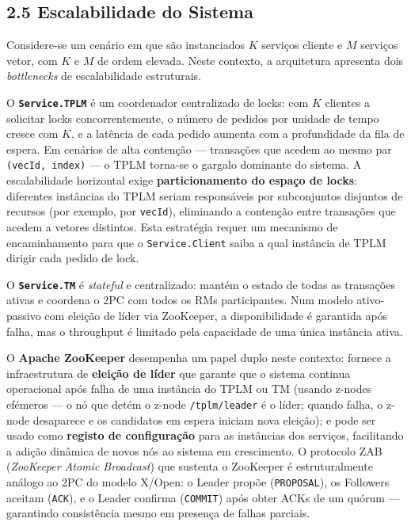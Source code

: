 \subsection*{2.5 Escalabilidade do Sistema}

Considere-se um cenário em que são instanciados $K$ serviços cliente e $M$ serviços vetor, com
$K$ e $M$ de ordem elevada. Neste contexto, a arquitetura apresenta dois \textit{bottlenecks}
de escalabilidade estruturais.

O \textbf{\texttt{Service.TPLM}} é um coordenador centralizado de locks: com $K$ clientes a
solicitar locks concorrentemente, o número de pedidos por unidade de tempo cresce com $K$, e a
latência de cada pedido aumenta com a profundidade da fila de espera. Em cenários de alta
contenção --- transações que acedem ao mesmo par \texttt{(vecId, index)} --- o TPLM torna-se o
gargalo dominante do sistema. A escalabilidade horizontal exige \textbf{particionamento do espaço
de locks}: diferentes instâncias do TPLM seriam responsáveis por subconjuntos disjuntos de
recursos (por exemplo, por \texttt{vecId}), eliminando a contenção entre transações que acedem a
vetores distintos. Esta estratégia requer um mecanismo de encaminhamento para que o
\texttt{Service.Client} saiba a qual instância de TPLM dirigir cada pedido de lock.

O \textbf{\texttt{Service.TM}} é \textit{stateful} e centralizado: mantém o estado de todas as
transações ativas e coordena o 2PC com todos os RMs participantes. Num modelo ativo-passivo com
eleição de líder via ZooKeeper, a disponibilidade é garantida após falha, mas o throughput é
limitado pela capacidade de uma única instância ativa.

O \textbf{Apache ZooKeeper} desempenha um papel duplo neste contexto: fornece a infraestrutura de
\textbf{eleição de líder} que garante que o sistema continua operacional após falha de uma
instância do TPLM ou TM (usando z-nodes efémeros --- o nó que detém o z-node \texttt{/tplm/leader}
é o líder; quando falha, o z-node desaparece e os candidatos em espera iniciam nova eleição); e
pode ser usado como \textbf{registo de configuração} para as instâncias dos serviços, facilitando
a adição dinâmica de novos nós ao sistema em crescimento. O protocolo ZAB (\textit{ZooKeeper
Atomic Broadcast}) que sustenta o ZooKeeper é estruturalmente análogo ao 2PC do modelo X/Open:
o Leader propõe (\texttt{PROPOSAL}), os Followers aceitam (\texttt{ACK}), e o Leader confirma
(\texttt{COMMIT}) após obter ACKs de um quórum --- garantindo consistência mesmo em presença de
falhas parciais.

